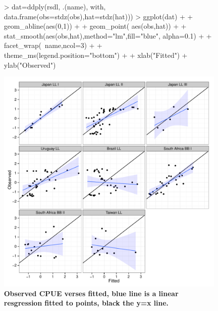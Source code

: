 \documentclass[shortnames,nojss,article]{jss}
\begin{document}
\begin{figure}\begin{center}
\begin{Schunk}
\begin{Sinput}
> dat=ddply(rsdl, .(name), with, data.frame(obs=stdz(obs),hat=stdz(hat)))
> ggplot(dat) +
+           geom_abline(aes(0,1))                         +
+           geom_point( aes(obs,hat))                     +
+           stat_smooth(aes(obs,hat),method="lm",fill="blue", alpha=0.1)       +
+           facet_wrap(~name,ncol=3)                      +
+           theme_ms(legend.position="bottom")            +
+           xlab("Fitted") + ylab("Observed")
\end{Sinput}
\end{Schunk}
\includegraphics{diags-013}
\caption{\bf{Observed CPUE verses fitted, blue line is a linear resgression fitted to points, black the y=x line.}}
\label{residual:1}
\end{center}
\end{figure}
\end{document}
